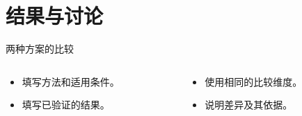 \section{结果与讨论}
\begin{frame}{两种方案的比较}
  \begin{columns}[T,onlytextwidth]
    \begin{column}{\hitleftwidth}
      \begin{itemize}
        \item 填写方法和适用条件。
        \item 填写已验证的结果。
      \end{itemize}
    \end{column}
    \begin{column}{\hitrightwidth}
      \begin{itemize}
        \item 使用相同的比较维度。
        \item 说明差异及其依据。
      \end{itemize}
    \end{column}
  \end{columns}
\end{frame}
